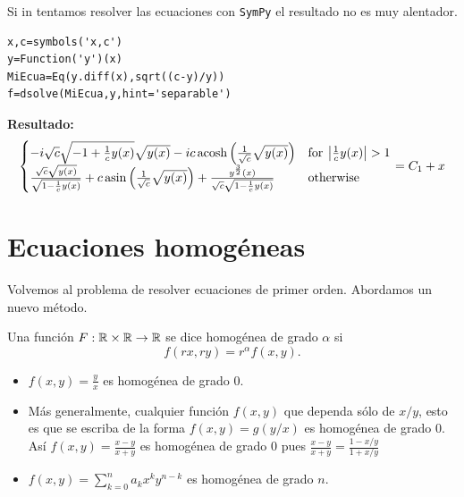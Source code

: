 Si in tentamos resolver las ecuaciones con \texttt{SymPy} el resultado no es muy alentador.
\begin{lstlisting}
x,c=symbols('x,c')
y=Function('y')(x)
MiEcua=Eq(y.diff(x),sqrt((c-y)/y))
f=dsolve(MiEcua,y,hint='separable')
\end{lstlisting}

\textbf{Resultado:}
\[
 \begin{cases} - i \sqrt{c} \sqrt{-1 + \frac{1}{c} y{\left (x \right )}} \sqrt{y{\left (x \right )}} - i c \operatorname{acosh}{\left (\frac{1}{\sqrt{c}} \sqrt{y{\left (x \right )}} \right )} & \text{for}\: \left\lvert{\frac{1}{c} y{\left (x \right )}}\right\rvert > 1 \\ \- \frac{\sqrt{c} \sqrt{y{\left (x \right )}}}{\sqrt{1 - \frac{1}{c} y{\left (x \right )}}} + c \operatorname{asin}{\left (\frac{1}{\sqrt{c}} \sqrt{y{\left (x \right )}} \right )} + \frac{y^{\frac{3}{2}}{\left (x \right )}}{\sqrt{c} \sqrt{1 - \frac{1}{c} y{\left (x \right )}}} & \text{otherwise} \end{cases} = C_{1} + x
\]



\section{Ecuaciones homogéneas}

Volvemos al problema de resolver ecuaciones de primer orden. Abordamos un nuevo método.

\begin{definicion}
 Una función $F:\rr\times\rr\to\rr$ se dice homogénea de grado $\alpha$ si
 \[f(rx,ry)=r^{\alpha}f(x,y).\]
\end{definicion}

\begin{ejemplo}

\begin{itemize}
                 \item $f(x,y)=\tfrac{y}{x}$ es homogénea de grado $0$.
                 \item Más generalmente, cualquier función $f(x,y)$ que dependa sólo de $x/y$, esto es que se escriba de la forma $f(x,y)=g(y/x)$
                 es homogénea de grado  $0$. Así $f(x,y)=\tfrac{x-y}{x+y}$ es homogénea de grado $0$ pues $\tfrac{x-y}{x+y}= \tfrac{1-x/y}{1+x/y}$
                 \item $f(x,y)=\sum_{k=0}^na_kx^ky^{n-k}$ es homogénea de grado $n$.
\end{itemize}
\end{ejemplo}



